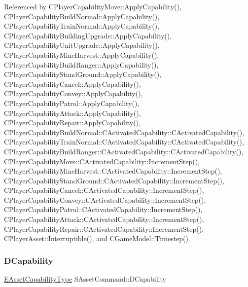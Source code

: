 Referenced by C\+Player\+Capability\+Move\+::\+Apply\+Capability(), C\+Player\+Capability\+Build\+Normal\+::\+Apply\+Capability(), C\+Player\+Capability\+Train\+Normal\+::\+Apply\+Capability(), C\+Player\+Capability\+Building\+Upgrade\+::\+Apply\+Capability(), C\+Player\+Capability\+Unit\+Upgrade\+::\+Apply\+Capability(), C\+Player\+Capability\+Mine\+Harvest\+::\+Apply\+Capability(), C\+Player\+Capability\+Build\+Ranger\+::\+Apply\+Capability(), C\+Player\+Capability\+Stand\+Ground\+::\+Apply\+Capability(), C\+Player\+Capability\+Cancel\+::\+Apply\+Capability(), C\+Player\+Capability\+Convey\+::\+Apply\+Capability(), C\+Player\+Capability\+Patrol\+::\+Apply\+Capability(), C\+Player\+Capability\+Attack\+::\+Apply\+Capability(), C\+Player\+Capability\+Repair\+::\+Apply\+Capability(), C\+Player\+Capability\+Build\+Normal\+::\+C\+Activated\+Capability\+::\+C\+Activated\+Capability(), C\+Player\+Capability\+Train\+Normal\+::\+C\+Activated\+Capability\+::\+C\+Activated\+Capability(), C\+Player\+Capability\+Build\+Ranger\+::\+C\+Activated\+Capability\+::\+C\+Activated\+Capability(), C\+Player\+Capability\+Move\+::\+C\+Activated\+Capability\+::\+Increment\+Step(), C\+Player\+Capability\+Mine\+Harvest\+::\+C\+Activated\+Capability\+::\+Increment\+Step(), C\+Player\+Capability\+Stand\+Ground\+::\+C\+Activated\+Capability\+::\+Increment\+Step(), C\+Player\+Capability\+Cancel\+::\+C\+Activated\+Capability\+::\+Increment\+Step(), C\+Player\+Capability\+Convey\+::\+C\+Activated\+Capability\+::\+Increment\+Step(), C\+Player\+Capability\+Patrol\+::\+C\+Activated\+Capability\+::\+Increment\+Step(), C\+Player\+Capability\+Attack\+::\+C\+Activated\+Capability\+::\+Increment\+Step(), C\+Player\+Capability\+Repair\+::\+C\+Activated\+Capability\+::\+Increment\+Step(), C\+Player\+Asset\+::\+Interruptible(), and C\+Game\+Model\+::\+Timestep().

\hypertarget{structSAssetCommand_a734ea7c6847457b437360f333f570ff9}{}\label{structSAssetCommand_a734ea7c6847457b437360f333f570ff9} 
\subsubsection{\texorpdfstring{D\+Capability}{DCapability}}
{\footnotesize\ttfamily \hyperlink{GameDataTypes_8h_a35b98ce26aca678b03c6f9f76e4778ce}{E\+Asset\+Capability\+Type} S\+Asset\+Command\+::\+D\+Capability}



